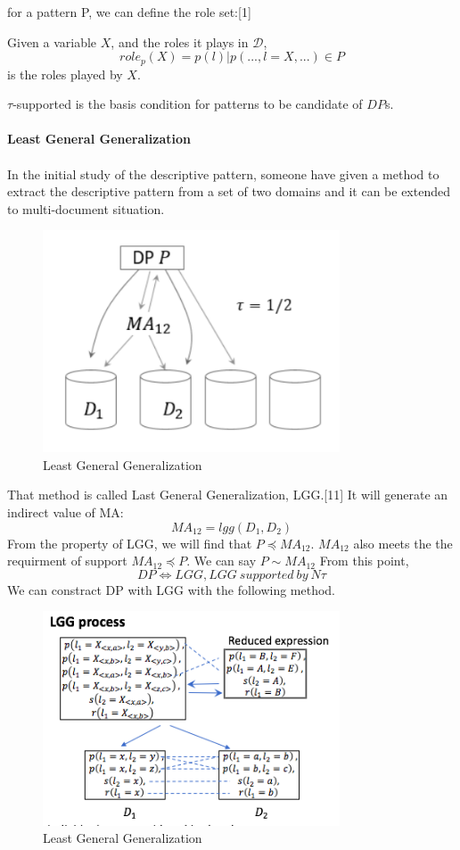 for a pattern P, we can define the role set:[1]
\begin{definition}
Given a variable $X$, and the roles it plays in $\mathcal{D}$,
\begin{displaymath}
role_p (X)={p(l)|p(...,l = X,...) \in P}
\end{displaymath}
is the roles played by $X$.
\end{definition}
$\tau$-supported is the basis condition for patterns to be candidate of $DP$s.\\ \\
\textbf{Least General Generalization}\\ \\
In the initial study of the descriptive pattern, someone have given a method to extract the descriptive pattern from a set of two domains and it can be extended to multi-document situation.
\begin{figure}[!h]
\centering
\includegraphics[width=250pt]{./pictures/0303-1.png}
\caption{Least General Generalization}
\end{figure}
That method is called Last General Generalization, LGG.[11] It will generate an indirect value of MA:
\begin{displaymath}
MA_{12} = lgg(D_1,D_2)
\end{displaymath}
From the property of LGG, we will find that $P \preceq MA_{12}$. $MA_{12}$ also meets the the requirment of support $MA_{12}\preceq P$. We can say $P \sim MA_{12}$
From this point,
\begin{displaymath}
DP \iff LGG, LGG\ supported\ by\ N\tau
\end{displaymath}
We can constract DP with LGG with the following method.
\begin{figure}[!h]
\centering
\includegraphics[width=250pt]{./pictures/0303-2.png}
\caption{Least General Generalization}
\end{figure}
